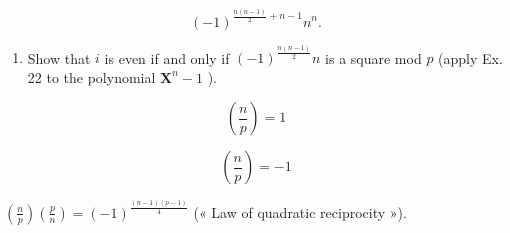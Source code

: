 \[
(- 1) ^ {\frac {n (n - 1)}{2} + n - 1} n ^ {n}.
\]

\begin{enumerate}
\def\labelenumi{\alph{enumi})}
\setcounter{enumi}{2}
\tightlist
\item
  Show that \(i\) is even if and only if \((-1)^{\frac{n(n - 1)}{2}} n\) is a square mod \(p\) (apply Ex. 22 to the polynomial \(\mathbf{X}^n - 1\) ).
\end{enumerate}

\[
\left(\frac {n}{p}\right) = 1
\]

\[
\left(\frac {n}{p}\right) = - 1
\]

\(\left(\frac{n}{p}\right)\left(\frac{p}{n}\right) = (-1)^{\frac{(n - 1)(p - 1)}{4}}\) (« Law of quadratic reciprocity »).
